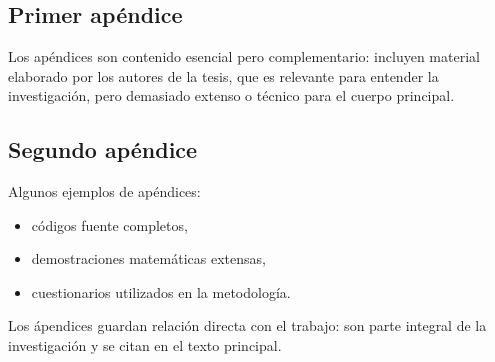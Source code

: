 \chapter*{\appendixname}%

\section{Primer apéndice}%
\label{apen:apen1}%
Los apéndices son contenido esencial pero complementario: incluyen material elaborado por los autores de la tesis, que es relevante para entender la investigación, pero demasiado extenso o técnico para el cuerpo principal.\par%

\section{Segundo apéndice}%
\label{apen:apen2}%
Algunos ejemplos de apéndices:%
\begin{itemize}
    \item códigos fuente completos,%
    \item demostraciones matemáticas extensas,%
    \item cuestionarios utilizados en la metodología.%
\end{itemize}
 
Los ápendices guardan relación directa con el trabajo: son parte integral de la investigación y se citan en el texto principal.\par%